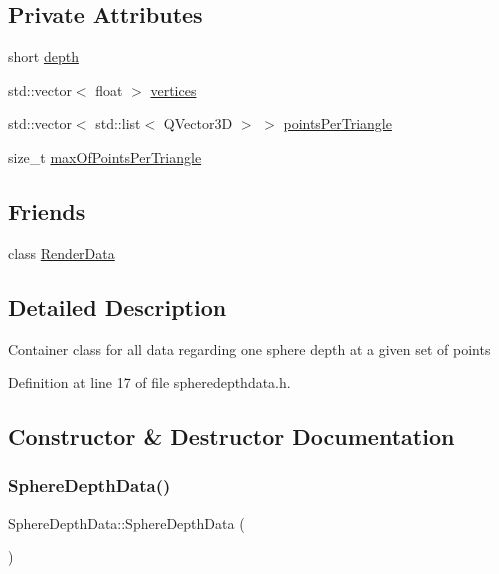 \subsection*{Private Attributes}
\begin{DoxyCompactItemize}
\item 
short \hyperlink{struct_sphere_depth_data_a32dc63866d12b3102942e14bb28238ff}{depth}
\item 
std\+::vector$<$ float $>$ \hyperlink{struct_sphere_depth_data_a139a9131aa15308e012fc8190de2011d}{vertices}
\item 
std\+::vector$<$ std\+::list$<$ Q\+Vector3D $>$ $>$ \hyperlink{struct_sphere_depth_data_a9decfacc00300c153ecff80288b7413f}{points\+Per\+Triangle}
\item 
size\+\_\+t \hyperlink{struct_sphere_depth_data_a6b284bce41596c9cbe39bda421c16cc6}{max\+Of\+Points\+Per\+Triangle}
\end{DoxyCompactItemize}
\subsection*{Friends}
\begin{DoxyCompactItemize}
\item 
class \hyperlink{struct_sphere_depth_data_a85dbb35e50f4a9c4a1d0f0c783959bdb}{Render\+Data}
\end{DoxyCompactItemize}


\subsection{Detailed Description}
Container class for all data regarding one sphere depth at a given set of points 

Definition at line 17 of file spheredepthdata.\+h.



\subsection{Constructor \& Destructor Documentation}
\mbox{\label{struct_sphere_depth_data_adf3b418ea38626e3d768240d257504ea}} 
\subsubsection{\texorpdfstring{Sphere\+Depth\+Data()}{SphereDepthData()}\hspace{0.1cm}{\footnotesize\ttfamily [1/2]}}
{\footnotesize\ttfamily Sphere\+Depth\+Data\+::\+Sphere\+Depth\+Data (\begin{DoxyParamCaption}{ }\end{DoxyParamCaption})\hspace{0.3cm}{\ttfamily [default]}}


